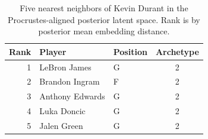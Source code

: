 \begin{table}[htbp]
  \centering\small
  \begin{tabular}{rllc}
    \toprule
    Rank & Player & Position & Archetype \\
    \midrule
    1 & LeBron James & G & 2 \\
    2 & Brandon Ingram & F & 2 \\
    3 & Anthony Edwards & G & 2 \\
    4 & Luka Doncic & G & 2 \\
    5 & Jalen Green & G & 2 \\
    \bottomrule
  \end{tabular}
  \caption{Five nearest neighbors of Kevin Durant in the Procrustes-aligned posterior latent space. Rank is by posterior mean embedding distance.}
  \label{tab:Kevin_Durant_neighbors}
\end{table}

